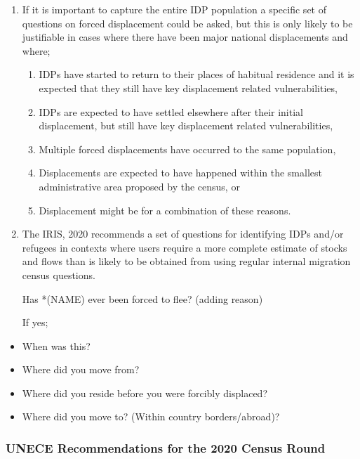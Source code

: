 \documentclass[
]{article}
\begin{document}
\begin{enumerate}
\def\labelenumi{\arabic{enumi}.}
\setcounter{enumi}{93}
\item
  If it is important to capture the entire IDP population a specific
  set of questions on forced displacement could be asked, but this is
  only likely to be justifiable in cases where there have been major
  national displacements and where;

  \begin{enumerate}
  \def\labelenumii{\arabic{enumii}.}
  \setcounter{enumii}{14}
  \item
    IDPs have started to return to their places of habitual
    residence and it is expected that they still have key
    displacement related vulnerabilities,
  \item
    IDPs are expected to have settled elsewhere after their initial
    displacement, but still have key displacement related
    vulnerabilities,
  \item
    Multiple forced displacements have occurred to the same
    population,
  \item
    Displacements are expected to have happened within the smallest
    administrative area proposed by the census, or
  \item
    Displacement might be for a combination of these reasons.
  \end{enumerate}
\item
  The IRIS, 2020 recommends a set of questions for identifying IDPs
  and/or refugees in contexts where users require a more complete
  estimate of stocks and flows than is likely to be obtained from
  using regular internal migration census questions.

  Has *(NAME) ever been forced to flee? (adding reason)

  If yes;
\end{enumerate}

\begin{itemize}
\item
  When was this?
\item
  Where did you move from?
\item
  Where did you reside before you were forcibly displaced?
\item
  Where did you move to? (Within country borders/abroad)?
\end{itemize}

\hypertarget{a.2.-unece-recommendations-for-the-2020-census-round}{%
\subsubsection{UNECE Recommendations for the 2020 Census Round}\label{a.2.-unece-recommendations-for-the-2020-census-round}}
\end{document}
